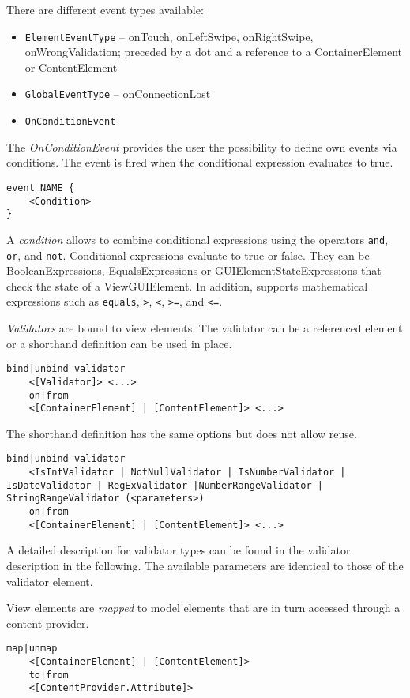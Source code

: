 There are different event types available:
\begin{itemize}
\item \lstinline!ElementEventType! -- onTouch, onLeftSwipe, onRightSwipe, onWrongValidation; preceded by a dot and a reference to a ContainerElement or ContentElement
\item \lstinline!GlobalEventType! -- onConnectionLost
\item \lstinline!OnConditionEvent!
\end{itemize}


The \textit{OnConditionEvent} provides the user the possibility to define own events via conditions. The event is fired when the conditional expression evaluates to true.
\begin{lstlisting}
event NAME {
	<Condition>
}
\end{lstlisting}

A \textit{condition} allows to combine conditional expressions using the operators \lstinline!and!, \lstinline!or!, and \lstinline!not!. Conditional expressions evaluate to true or false. They can be BooleanExpressions, EqualsExpressions or GUIElementStateExpressions that check the state of a ViewGUIElement. In addition, \MD supports mathematical expressions such as \lstinline!equals!, \lstinline!>!, \lstinline!<!, \lstinline!>=!, and \lstinline!<=!.

\textit{Validators} are bound to view elements. The validator can be a referenced element or a shorthand definition can be used in place.
\begin{lstlisting}
bind|unbind validator
	<[Validator]> <...>
	on|from
	<[ContainerElement] | [ContentElement]> <...>
\end{lstlisting}

The shorthand definition has the same options but does not allow reuse.
\begin{lstlisting}
bind|unbind validator
	<IsIntValidator | NotNullValidator | IsNumberValidator | IsDateValidator | RegExValidator |NumberRangeValidator | StringRangeValidator (<parameters>)
	on|from
	<[ContainerElement] | [ContentElement]> <...>
\end{lstlisting}

A detailed description for validator types can be found in the validator description in the following. The available parameters are identical to those of the validator element.

View elements are \textit{mapped} to model elements that are in turn accessed through a content provider.
\begin{lstlisting}
map|unmap
	<[ContainerElement] | [ContentElement]>
	to|from
	<[ContentProvider.Attribute]>

\end{lstlisting}


